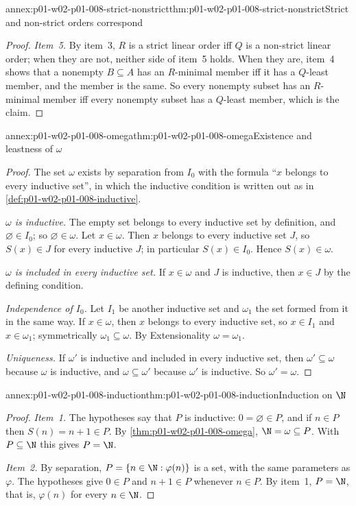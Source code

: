 \begin{annexitem}{annex:p01-w02-p01-008-strict-nonstrict}{thm:p01-w02-p01-008-strict-nonstrict}{Strict and non-strict orders correspond}
\begin{proof}
\emph{Item~5.} By item~3, \(R\) is a strict linear order iff \(Q\) is a
non-strict linear order; when they are not, neither side of item~5 holds.
When they are, item~4 shows that a nonempty
\(B\subseteq A\) has an \(R\)-minimal member iff it has a \(Q\)-least
member, and the member is the same. So every nonempty subset has an
\(R\)-minimal member iff every nonempty subset has a \(Q\)-least member,
which is the claim.
\end{proof}
\end{annexitem}

\begin{annexitem}{annex:p01-w02-p01-008-omega}{thm:p01-w02-p01-008-omega}{Existence and leastness of \(\omega\)}
\begin{proof}
The set \(\omega\) exists by separation from \(I_0\) with the formula
``\(x\) belongs to every inductive set'', in which the inductive condition
is written out as in \cref{def:p01-w02-p01-008-inductive}.

\emph{\(\omega\) is inductive.} The empty set belongs to every inductive set
by definition, and \(\varnothing\in I_0\); so \(\varnothing\in\omega\). Let
\(x\in\omega\). Then \(x\) belongs to every inductive set \(J\), so
\(S(x)\in J\) for every inductive \(J\); in particular \(S(x)\in I_0\).
Hence \(S(x)\in\omega\).

\emph{\(\omega\) is included in every inductive set.} If \(x\in\omega\) and
\(J\) is inductive, then \(x\in J\) by the defining condition.

\emph{Independence of \(I_0\).} Let \(I_1\) be another inductive set and
\(\omega_1\) the set formed from it in the same way. If \(x\in\omega\), then
\(x\) belongs to every inductive set, so \(x\in I_1\) and \(x\in\omega_1\);
symmetrically \(\omega_1\subseteq\omega\). By Extensionality
\(\omega=\omega_1\).

\emph{Uniqueness.} If \(\omega'\) is inductive and included in every
inductive set, then \(\omega'\subseteq\omega\) because \(\omega\) is
inductive, and \(\omega\subseteq\omega'\) because \(\omega'\) is inductive.
So \(\omega'=\omega\).
\end{proof}
\end{annexitem}

\begin{annexitem}{annex:p01-w02-p01-008-induction}{thm:p01-w02-p01-008-induction}{Induction on \(\N\)}
\begin{proof}
\emph{Item~1.} The hypotheses say that \(P\) is inductive: \(0=\varnothing\in P\),
and if \(n\in P\) then \(S(n)=n+1\in P\). By
\cref{thm:p01-w02-p01-008-omega}, \(\N=\omega\subseteq P\). With
\(P\subseteq\N\) this gives \(P=\N\).

\emph{Item~2.} By separation, \(P=\{n\in\N:\varphi(n)\}\) is a set, with
the same parameters as \(\varphi\). The hypotheses give \(0\in P\) and
\(n+1\in P\) whenever \(n\in P\). By item~1, \(P=\N\), that is,
\(\varphi(n)\) for every \(n\in\N\).
\end{proof}
\end{annexitem}

